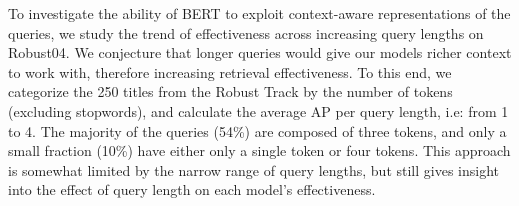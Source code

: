 \begin{table}[b!]
\centering{}
\caption{Average AP with respect to query length on Robust04.}
\label{tab:results-query-length}
\end{table}

To investigate the ability of BERT to exploit context-aware representations of the queries, we study the trend of effectiveness across increasing query lengths on Robust04.
We conjecture that longer queries would give our models richer context to work with, therefore increasing retrieval effectiveness.
To this end, we categorize the 250 titles from the Robust Track by the number of tokens (excluding stopwords), and calculate the average AP per query length, i.e: from 1 to 4.
The majority of the queries (54\%) are composed of three tokens, and only a small fraction (10\%) have either only a single token or four tokens.
This approach is somewhat limited by the narrow range of query lengths, but still gives insight into the effect of query length on each model's effectiveness.

